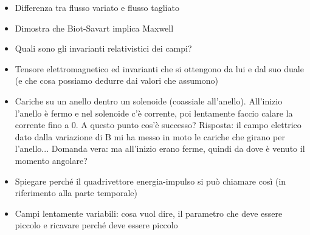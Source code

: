 \documentclass[a4paper,NoNotes,GeneralMath]{stdmdoc}
\begin{document}
\begin{itemize}
		\item Differenza tra flusso variato e flusso tagliato
		\item Dimostra che Biot-Savart implica Maxwell
		\item Quali sono gli invarianti relativistici dei campi?
		\item Tensore elettromagnetico ed invarianti che si ottengono da lui e dal suo duale (e che cosa possiamo dedurre dai valori che assumono)
		\item Cariche su un anello dentro un solenoide (coassiale all'anello). All'inizio l'anello è fermo e nel solenoide c'è corrente, poi lentamente faccio calare la corrente fino a 0. A questo punto cos'è successo? Risposta: il campo elettrico dato dalla variazione di B mi ha messo in moto le cariche che girano per l'anello... Domanda vera: ma all'inizio erano ferme, quindi da dove è venuto il momento angolare?
		\item Spiegare perché il quadrivettore energia-impulso si può chiamare così (in riferimento alla parte temporale)
		\item Campi lentamente variabili: cosa vuol dire, il parametro che deve essere piccolo e ricavare perché deve essere piccolo
	\end{itemize}
\end{document}

